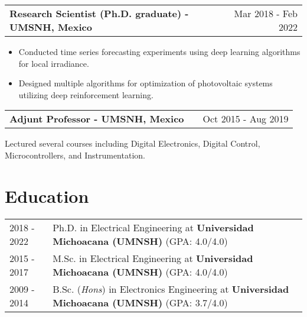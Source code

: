\documentclass[a4paper,10pt]{article}
\makeatletter
\newenvironment{jobshort}[2]
    {
    \begin{tabularx}{\linewidth}{@{}l X r@{}}
    \textbf{#1} & \hfill &  #2 \\[3.75pt]
    \end{tabularx}
    }
    {
    }
\newenvironment{joblong}[2]
    {
    \begin{tabularx}{\linewidth}{@{}l X r@{}}
    \textbf{#1} & \hfill &  #2 \\[3.75pt]
    \end{tabularx}
    \begin{minipage}[t]{\linewidth}
    \begin{itemize}[nosep,after=\strut, leftmargin=1em, itemsep=3pt,label=--]
    }
    {
    \end{itemize}
    \end{minipage}    
    }
\makeatother
\begin{document}
\begin{joblong}{Research Scientist (Ph.D. graduate) - UMSNH, Mexico}{Mar 2018 - Feb 2022}
\item Conducted time series forecasting experiments using deep learning algorithms for local irradiance.
\item Designed multiple algorithms for optimization of photovoltaic systems utilizing deep reinforcement learning.
\end{joblong}

\begin{jobshort}{Adjunt Professor - UMSNH, Mexico}{Oct 2015 - Aug 2019}
Lectured several courses including Digital Electronics, Digital Control, Microcontrollers, and Instrumentation.
\end{jobshort}




\section{Education}
\begin{tabularx}{\linewidth}{@{}l X@{}}	
2018 - 2022 & Ph.D. in Electrical Engineering  at \textbf{Universidad Michoacana (UMNSH)} \hfill \normalsize (GPA: 4.0/4.0) \\

2015 - 2017 & M.Sc. in Electrical Engineering at \textbf{Universidad Michoacana (UMNSH)} \hfill (GPA: 4.0/4.0) \\ 

2009 - 2014 & B.Sc. (\textit{Hons}) in Electronics Engineering at \textbf{Universidad Michoacana (UMNSH)} \hfill (GPA: 3.7/4.0) \\ 
\end{tabularx}
\end{document}

